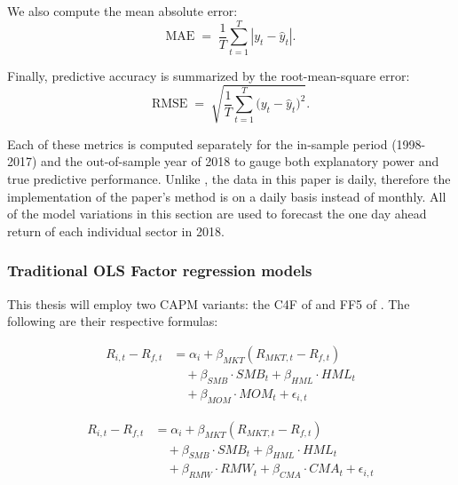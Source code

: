 We also compute the mean absolute error:
\begin{equation}
\label{eq:mae}
\mathrm{MAE} \;=\; \frac{1}{T}\sum_{t=1}^{T}|y_{t}-\hat y_{t}|.
\end{equation}

Finally, predictive accuracy is summarized by the root-mean-square error:  
\begin{equation}
\label{eq:rmse}
\mathrm{RMSE} \;=\; \sqrt{\frac{1}{T}\sum_{t=1}^{T}\bigl(y_{t}-\hat y_{t}\bigr)^2}.
\end{equation}  


Each of these metrics is computed separately for the in-sample period (1998-2017) and the out-of-sample year of 2018 to gauge both explanatory power and true predictive performance. Unlike , the data in this paper is daily, therefore the implementation of the paper's method is on a daily basis instead of monthly. All of the model variations in this section are used to forecast the one day ahead return of each individual sector in 2018. 

\subsubsection{Traditional OLS Factor regression models}
This thesis will employ two CAPM variants: the C4F of  and FF5 of . The following are their respective formulas:

\begin{equation}
    \label{eq:c4f}
    \begin{split}
        R_{i,t} - R_{f,t} &= \alpha_i + \beta_{MKT} (R_{MKT,t} - R_{f,t}) \\
        &\quad + \beta_{SMB} \cdot SMB_t + \beta_{HML} \cdot HML_t \\
        &\quad + \beta_{MOM} \cdot MOM_t + \epsilon_{i,t}
    \end{split}
\end{equation}

\begin{equation}
    \label{eq:ff5}
    \begin{split}
        R_{i,t} - R_{f,t} &= \alpha_i + \beta_{MKT} (R_{MKT,t} - R_{f,t}) \\
        &\quad + \beta_{SMB} \cdot SMB_t + \beta_{HML} \cdot HML_t \\
        &\quad + \beta_{RMW} \cdot RMW_t + \beta_{CMA} \cdot CMA_t + \epsilon_{i,t}
    \end{split}
\end{equation}

